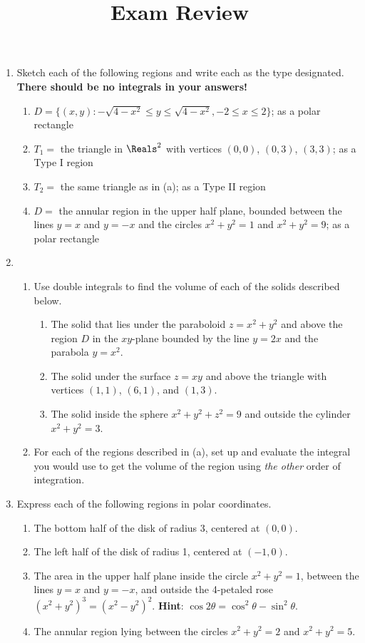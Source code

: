 \documentclass[12pt]{article}
\title{\vspace{-0.75in}\LARGE{Exam Review}\vspace{-0.625in}}
\date{}
\newcommand{\hintbf}[1]{\textbf{Hint}: #1}
\begin{document}
	\maketitle
	
	\begin{enumerate}
		\item Sketch each of the following regions and write each as the type designated. \textbf{There should be no integrals in your answers!}
		\begin{enumerate}
			\item $D=\{(x,y):-\sqrt{4-x^2}\leq y\leq \sqrt{4-x^2},-2\leq x\leq2\}$; as a polar rectangle
			\item $T_1=$ the triangle in $\Reals^2$ with vertices $(0,0)$, $(0,3)$, $(3,3)$; as a Type I region
			\item $T_2=$ the same triangle as in (a); as a Type II region
			\item $D=$ the annular region in the upper half plane, bounded between the lines $y=x$ and $y=-x$ and the circles $x^2+y^2=1$ and $x^2+y^2=9$; as a polar rectangle
		\end{enumerate}
		
		\item \begin{enumerate}
			\item Use double integrals to find the volume of each of the solids described below.
			\begin{enumerate} 
				\item The solid that lies under the paraboloid $z=x^2+y^2$ and above the region $D$ in the $xy$-plane bounded by the line $y=2x$ and the parabola $y=x^2$.
				\item The solid under the surface $z=xy$ and above the triangle with vertices $(1,1)$, $(6,1)$, and $(1,3)$.
				\item The solid inside the sphere $x^2+y^2+z^2=9$ and outside the cylinder $x^2+y^2=3$.
			\end{enumerate}

			\item For each of the regions described in (a), set up and evaluate the integral you would use to get the volume of the region using \textit{the other} order of integration.
		\end{enumerate}
		
		\item Express each of the following regions in polar coordinates.
		\begin{enumerate}
			\item The bottom half of the disk of radius 3, centered at $(0,0)$.
			\item The left half of the disk of radius 1, centered at $(-1,0)$.
			\item The area in the upper half plane inside the circle $x^2+y^2=1$, between the lines $y=x$ and $y=-x$, and outside the 4-petaled rose $(x^2+y^2)^3=(x^2-y^2)^2$. \hintbf{$\cos{2\theta}=\cos^2{\theta}-\sin^2{\theta}$.}
			\item The annular region lying between the circles $x^2+y^2=2$ and $x^2+y^2=5$.
		\end{enumerate}
		

\end{enumerate}
\end{document}
